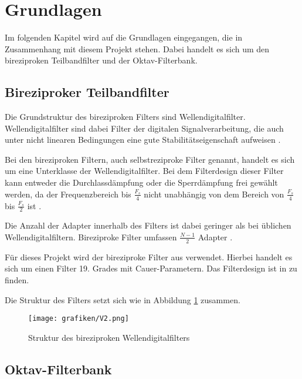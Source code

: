 %

\section{Grundlagen}
Im folgenden Kapitel wird auf die Grundlagen eingegangen, die in Zusammenhang mit diesem Projekt stehen. Dabei handelt es sich um den bireziproken Teilbandfilter und der Oktav-Filterbank.

\subsection{Bireziproker Teilbandfilter}
Die Grundstruktur des bireziproken Filters sind Wellendigitalfilter. Wellendigitalfilter sind dabei Filter der digitalen Signalverarbeitung, die auch unter nicht linearen Bedingungen eine gute Stabilitätseigenschaft aufweisen \cite[vgl.][S. 68]{gaszi1983}.\par
Bei den bireziproken Filtern, auch selbstreziproke Filter genannt, handelt es sich um eine Unterklasse der Wellendigitalfilter. Bei dem Filterdesign dieser Filter kann entweder die Durchlassdämpfung oder die Sperrdämpfung frei gewählt werden, da der Frequenzbereich bis $\frac{F_s}{4}$ nicht unabhängig von dem Bereich von $\frac{F_s}{4}$ bis $\frac{F_s}{2}$ ist \cite[vgl.][S. 72]{gaszi1983}.\par
Die Anzahl der Adapter innerhalb des Filters ist dabei geringer als bei üblichen Wellendigitalfiltern. Bireziproke Filter umfassen $\frac{N - 1}{2}$ Adapter \cite[vgl.][S. 73]{gaszi1983}.\par
Für dieses Projekt wird der bireziproke Filter aus \cite{gaszi1983} verwendet. Hierbei handelt es sich um einen Filter 19. Grades mit Cauer-Parametern. Das Filterdesign ist in \cite[][S. 74]{gaszi1983} zu finden.\par
Die Struktur des Filters setzt sich wie in Abbildung \ref{fig:bireziprok_Struktur} zusammen.
\begin{figure}[h!]
	\centering	\texttt{[image: grafiken/V2.png]}
	\caption{Struktur des bireziproken Wellendigitalfilters}
	\label{fig:bireziprok_Struktur}
\end{figure}

\subsection{Oktav-Filterbank}